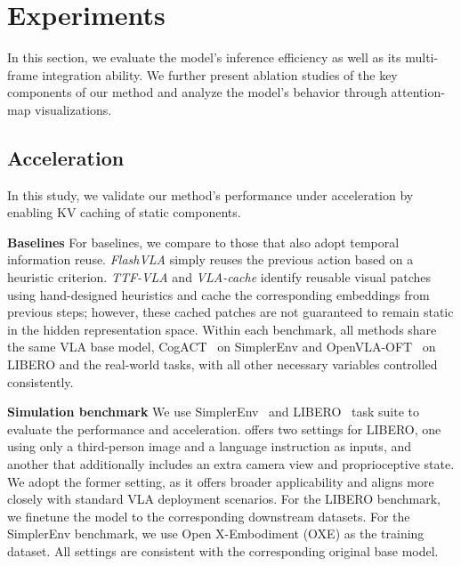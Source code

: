 \section{Experiments}
In this section, we evaluate the model’s inference efficiency as well as its multi-frame integration ability. We further present ablation studies of the key components of our method and analyze the model’s behavior through attention-map visualizations.


\subsection{Acceleration}
In this study, we validate our method's performance under acceleration by enabling KV caching of static components. 

\noindent\textbf{Baselines}
For baselines, we compare to those that also adopt temporal information reuse. \emph{FlashVLA} \citep{tan2025think} simply reuses the previous action based on a heuristic criterion.
\emph{TTF-VLA} \citep{liu2025ttf} and \emph{VLA-cache} \citep{xu2025vla} identify reusable visual patches using hand-designed heuristics and cache the corresponding embeddings from previous steps; however, these cached patches are not guaranteed to remain static in the hidden representation space. Within each benchmark, all methods share the same VLA base model, CogACT~\citep{li2024cogact} on SimplerEnv and OpenVLA-OFT~\citep{kim2025fine} on LIBERO and the real-world tasks, with all other necessary variables controlled consistently.

\noindent\textbf{Simulation benchmark}
We use SimplerEnv~\citep{li2024evaluating} and LIBERO~\citep{liu2023libero} task suite to evaluate the performance and acceleration. \citet{kim2025fine} offers two settings for LIBERO, one using only a third-person image and a language instruction as inputs, and another that additionally includes an extra camera view and proprioceptive state. We adopt the former setting, as it offers broader applicability and aligns more closely with standard VLA deployment scenarios. For the LIBERO benchmark, we finetune the model to the corresponding downstream datasets. For the SimplerEnv benchmark, we use Open X-Embodiment (OXE) \citep{vuong2023open} as the training dataset. All settings are consistent with the corresponding original base model.



